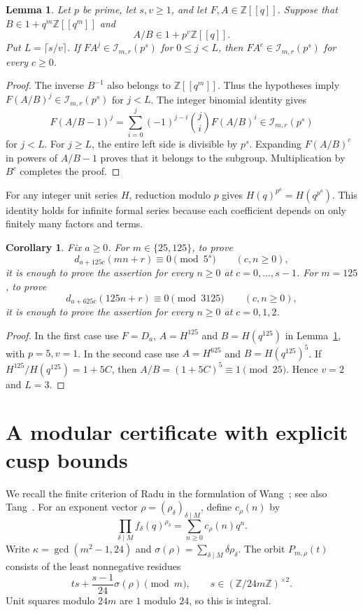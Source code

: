 \documentclass[11pt]{article}
\newtheorem{lemma}[theorem]{Lemma}
\newtheorem{corollary}[theorem]{Corollary}
\newcommand{\Z}{\mathbb Z}
\newcommand{\dd}{\delta}
\begin{document}
\begin{lemma}\label{lem:parameter}
Let $p$ be prime, let $s,v\ge1$, and let $F,A\in\Z[[q]]$. Suppose that $B\in1+q^m\Z[[q^m]]$ and
\[
 A/B\in1+p^v\Z[[q]].
\]
Put $L=\lceil s/v\rceil$. If $FA^j\in\mathcal I_{m,r}(p^s)$ for $0\le j<L$, then $FA^c\in\mathcal I_{m,r}(p^s)$ for every $c\ge0$.
\end{lemma}
\begin{proof}
The inverse $B^{-1}$ also belongs to $\Z[[q^m]]$. Thus the hypotheses imply $F(A/B)^j\in\mathcal I_{m,r}(p^s)$ for $j<L$. The integer binomial identity gives
\[
 F(A/B-1)^j=\sum_{i=0}^j(-1)^{j-i}\binom ji F(A/B)^i\in\mathcal I_{m,r}(p^s)
\]
for $j<L$. For $j\ge L$, the entire left side is divisible by $p^s$. Expanding $F(A/B)^c$ in powers of $A/B-1$ proves that it belongs to the subgroup. Multiplication by $B^c$ completes the proof.
\end{proof}

For any integer unit series $H$, reduction modulo $p$ gives $H(q)^{p^a}=H(q^{p^a})$. This identity holds for infinite formal series because each coefficient depends on only finitely many factors and terms.

\begin{corollary}\label{cor:transfer}
Fix $a\ge0$. For $m\in\{25,125\}$, to prove
\[
 d_{a+125c}(mn+r)\equiv0\pmod{5^s}\qquad(c,n\ge0),
\]
it is enough to prove the assertion for every $n\ge0$ at $c=0,\ldots,s-1$.
For $m=125$, to prove
\[
 d_{a+625c}(125n+r)\equiv0\pmod{3125}\qquad(c,n\ge0),
\]
it is enough to prove the assertion for every $n\ge0$ at $c=0,1,2$.
\end{corollary}
\begin{proof}
In the first case use $F=D_a$, $A=H^{125}$ and $B=H(q^{125})$ in Lemma~\ref{lem:parameter}, with $p=5,v=1$. In the second case use $A=H^{625}$ and $B=H(q^{125})^5$. If $H^{125}/H(q^{125})=1+5C$, then $A/B=(1+5C)^5\equiv1\pmod{25}$. Hence $v=2$ and $L=3$.
\end{proof}

\section{A modular certificate with explicit cusp bounds}
We recall the finite criterion of Radu in the formulation of Wang~\cite[Definition 4.1 and Lemmas 4.2--4.3]{Wang}; see also Tang~\cite[Lemma 7]{Tang}. For an exponent vector $\rho=(\rho_\dd)_{\dd\mid M}$, define $c_\rho(n)$ by
\[
 \prod_{\dd\mid M}f_\dd(q)^{\rho_\dd}=\sum_{n\ge0}c_\rho(n)q^n.
\]
Write $\kappa=\gcd(m^2-1,24)$ and $\sigma(\rho)=\sum_{\dd\mid M}\dd\rho_\dd$. The orbit $P_{m,\rho}(t)$ consists of the least nonnegative residues
\begin{equation}\label{eq:orbit}
 ts+\frac{s-1}{24}\sigma(\rho)\pmod m,
 \qquad s\in(\Z/24m\Z)^{\times2}.
\end{equation}
Unit squares modulo $24m$ are $1$ modulo $24$, so this is integral.
\end{document}
